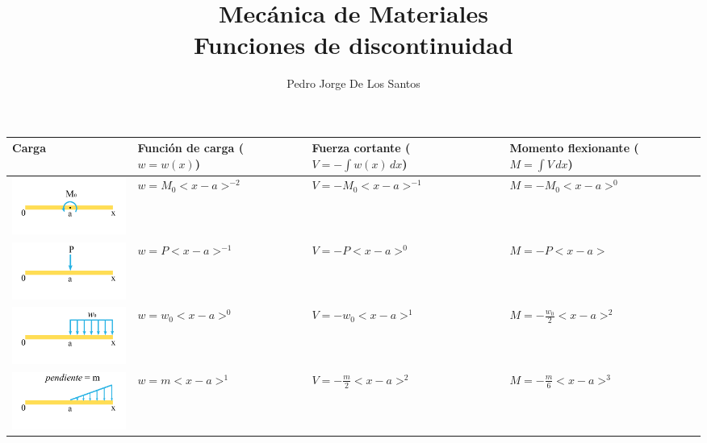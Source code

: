 \documentclass[12pt,letterpaper,landscape]{article}
\author{Pedro Jorge De Los Santos}
\title{
\vspace{-20mm}
{\large Mecánica de Materiales} \\
{\large Funciones de discontinuidad}
}
\begin{document}
\maketitle

\begin{table}[h]
\centering
\small
\begin{tabular}{P{4cm} P{4.5cm} P{4.5cm} P{4.5cm} } \hline
\bfseries Carga & \bfseries Función de carga ($w = w(x)$) & \bfseries Fuerza cortante ($ V = -\int w(x)\,dx $) & \bfseries Momento flexionante ($M = \int V\,dx$) \\
\hline

\includegraphics[width=4cm]{img/moment.pdf} & $ w = M_0 <x-a>^{-2} $ &  $V = -M_0<x-a>^{-1}$ & $ M = -M_0<x-a>^0 $ \\
\includegraphics[width=4cm]{img/force.pdf} & $ w = P <x-a>^{-1} $ &  $V = -P<x-a>^{0}$  & $ M = -P<x-a> $ \\
\includegraphics[width=4cm]{img/distributed_force.pdf} & $ w = w_0 <x-a>^{0} $ &  $V = -w_0<x-a>^{1}$  & $ M = -\frac{w_0}{2} <x-a>^{2} $ \\
\includegraphics[width=4cm]{img/distributed_force_slope.pdf} & $ w = m <x-a>^{1} $ &  $V = -\frac{m}{2} <x-a>^{2}$  & $ M = -\frac{m}{6} <x-a>^{3} $ \\

\hline
\end{tabular}
\end{table}
\end{document}
